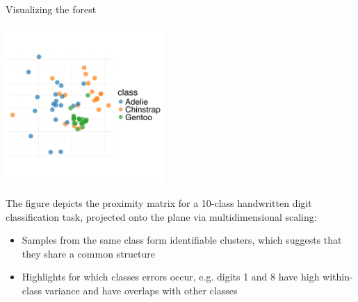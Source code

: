 \documentclass[11pt,compress,t,notes=noshow, xcolor=table]{beamer}
\begin{document}
\begin{vbframe}{Visualizing the forest}

\vspace{-6ex}
\begin{center}
\includegraphics[width=0.45\textwidth]{figure/forest-prox-vis_1.png}
\end{center}
\vspace{-4ex}
{\small
The figure  depicts the proximity matrix for a 10-class handwritten digit classification task, projected onto the plane via multidimensional scaling:
\begin{itemize}
  \item Samples from the same class form identifiable clusters, which suggests that they share a common structure
  \item Highlights for which classes errors occur, e.g. digits 1 and 8 have high within-class variance and have overlaps with other classes 
\end{itemize}
}

\end{vbframe}
\end{document}
